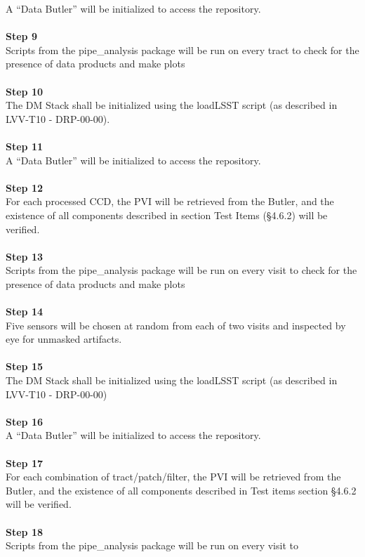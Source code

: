 A ``Data Butler'' will be initialized to access the repository.\\
~\\
\textbf{Step 9}\\
Scripts from the pipe\_analysis package will be run on every tract to
check for the presence of data products and make plots\\
~\\
\textbf{Step 10}\\
The DM Stack shall be initialized using the loadLSST script (as
described in LVV-T10 - DRP-00-00).\\
~\\
\textbf{Step 11}\\
A ``Data Butler'' will be initialized to access the repository.\\
~\\
\textbf{Step 12}\\
For each processed CCD, the PVI will be retrieved from the Butler, and
the existence of all components described in section Test Items (§4.6.2)
will be verified.\\
~\\
\textbf{Step 13}\\
Scripts from the pipe\_analysis package will be run on every visit to
check for the presence of data products and make plots\\
~\\
\textbf{Step 14}\\
Five sensors will be chosen at random from each of two visits and
inspected by eye for unmasked artifacts.\\
~\\
\textbf{Step 15}\\
The DM Stack shall be initialized using the loadLSST script (as
described in LVV-T10 - DRP-00-00)\\
~\\
\textbf{Step 16}\\
A ``Data Butler'' will be initialized to access the repository.\\
~\\
\textbf{Step 17}\\
For each combination of tract/patch/filter, the PVI will be retrieved
from the Butler, and the existence of all components described in Test
items section §4.6.2 will be verified.\\
~\\
\textbf{Step 18}\\
Scripts from the pipe\_analysis package will be run on every visit to
